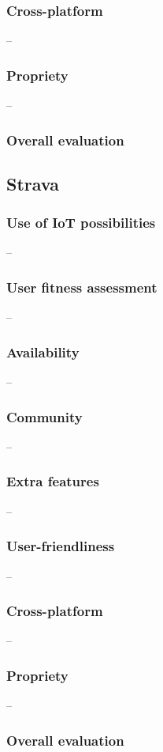 \subsubsection*{Cross-platform} -- 
\subsubsection*{Propriety} -- 
\subsubsection*{Overall evaluation}

\subsection{Strava}

\subsubsection*{Use of IoT possibilities} --
\subsubsection*{User fitness assessment} --
\subsubsection*{Availability} --
\subsubsection*{Community} -- 
\subsubsection*{Extra features} -- 
\subsubsection*{User-friendliness} -- 
\subsubsection*{Cross-platform} -- 
\subsubsection*{Propriety} -- 
\subsubsection*{Overall evaluation}

